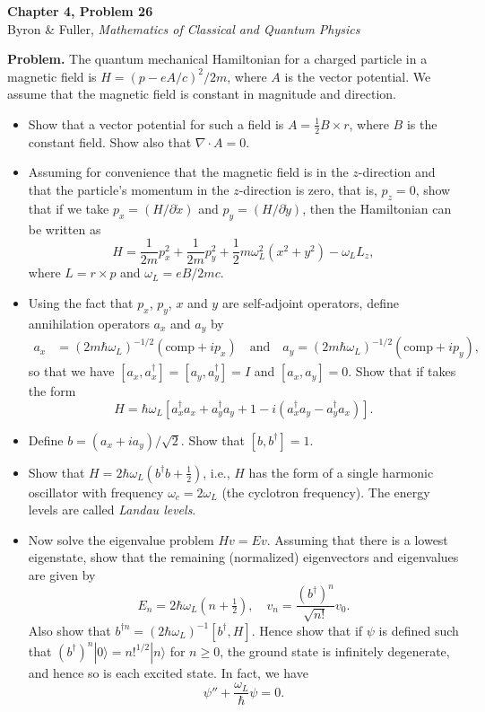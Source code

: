 \documentclass[12pt]{article}
\begin{document}
\begin{center}
{\Large\bfseries Chapter 4, Problem 26}\\[6pt]
Byron \& Fuller, \textit{Mathematics of Classical and Quantum Physics}
\end{center}

\bigskip

\textbf{Problem.} The quantum mechanical Hamiltonian for a charged particle in a magnetic field is $H = (p - eA/c)^2/2m$, where $A$ is the vector potential. We assume that the magnetic field is constant in magnitude and direction.

\begin{itemize}
\item[(a)] Show that a vector potential for such a field is $A = \frac{1}{2}B \times r$, where $B$ is the constant field. Show also that $\nabla \cdot A = 0$.
\item[(b)] Assuming for convenience that the magnetic field is in the $z$-direction and that the particle's momentum in the $z$-direction is zero, that is, $p_z = 0$, show that if we take $p_x = (H/\partial\dot{x})$ and $p_y = (H/\partial\dot{y})$, then the Hamiltonian can be written as
\[
H = \frac{1}{2m}p_x^2 + \frac{1}{2m}p_y^2 + \frac{1}{2}m\omega_L^2(x^2+y^2) - \omega_L L_z,
\]
where $L = r \times p$ and $\omega_L = eB/2mc$.
\item[(c)] Using the fact that $p_x$, $p_y$, $x$ and $y$ are self-adjoint operators, define annihilation operators $a_x$ and $a_y$ by
\begin{align*}
a_x &= (2m\hbar\omega_L)^{-1/2}(\text{comp} + ip_x) \quad \text{and} \quad a_y = (2m\hbar\omega_L)^{-1/2}(\text{comp} + ip_y),
\end{align*}
so that we have $[a_x, a_x^\dagger] = [a_y, a_y^\dagger] = I$ and $[a_x, a_y] = 0$. Show that if takes the form
\[
H = \hbar\omega_L[a_x^\dagger a_x + a_y^\dagger a_y + 1 - i(a_x^\dagger a_y - a_y^\dagger a_x)].
\]
\item[(d)] Define $b = (a_x + ia_y)/\sqrt{2}$. Show that $[b, b^\dagger] = 1$.
\item[(e)] Show that $H = 2\hbar\omega_L(b^\dagger b + \frac{1}{2})$, i.e., $H$ has the form of a single harmonic oscillator with frequency $\omega_c = 2\omega_L$ (the cyclotron frequency). The energy levels are called \textit{Landau levels}.
\item[(f)] Now solve the eigenvalue problem $Hv = Ev$. Assuming that there is a lowest eigenstate, show that the remaining (normalized) eigenvectors and eigenvalues are given by
\[
E_n = 2\hbar\omega_L(n + \tfrac{1}{2}), \quad v_n = \frac{(b^\dagger)^n}{\sqrt{n!}}v_0.
\]
Also show that $b^{\dagger n} = (2\hbar\omega_L)^{-1}[b^\dagger, H]$. Hence show that if $\psi$ is defined such that $(b^\dagger)^n|0\rangle = n!^{1/2}|n\rangle$ for $n \geq 0$, the ground state is infinitely degenerate, and hence so is each excited state. In fact, we have
\[
\psi'' + \frac{\omega_L}{\hbar}\psi = 0.
\]
\end{itemize}
\end{document}
